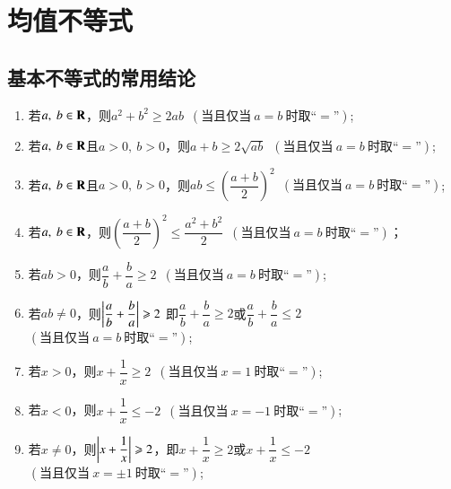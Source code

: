 \documentclass{BHCexam}
\begin{document}
\renewcommand{\theexample}{\arabic{example}}
\newenvironment{example}[1][]{\par \hspace{-3.5em}\refstepcounter{example}\textbf{例 \theexample:\ #1} \hspace{0.5em}}{\hspace{\stretch{4}} \par  }
\newcommand{\da}[1]{\noindent {\kaishu \textbf{解:}#1}}

\fubiaoti{}
 \maketitle
\section{均值不等式}
\subsection{基本不等式的常用结论}
\begin{enumerate}
\item 若$ a,~b\in\mathbf{R} $，则$ a^2+b^2\ge 2ab $\ $\left(\text{当且仅当}~a=b~\text{时取}“=”\right)$;
\item 若$ a,~b\in\mathbf{R} $且$ a>0,~b>0 $，则$ a+b\ge 2\sqrt{ab} $\ $\left(\text{当且仅当}~a=b~\text{时取}“=”\right)$;
\item 若$ a,~b\in\mathbf{R} $且$ a>0,~b>0 $，则$ab\le\left(\dfrac{a+b}{2}\right)^2$\ $\left(\text{当且仅当}~a=b~\text{时取}“=”\right)$;
\item 若$ a,~b\in\mathbf{R} $，则$ \left(\dfrac{a+b}{2}\right)^2\le \dfrac{a^2+b^2}{2} $\ $\left(\text{当且仅当}~a=b~\text{时取}“=”\right)$；
\item 若$ ab>0 $，则$ \dfrac{a}{b}+\dfrac{b}{a}\ge 2 $\ $\left(\text{当且仅当}~a=b~\text{时取}“=”\right)$;
\item 若$ ab\ne 0 $，则$ \left| \dfrac{a}{b}+\dfrac{b}{a} \right|\geqslant 2 $ 即$ \dfrac{a}{b}+\dfrac{b}{a}\ge 2 $或$ \dfrac{a}{b}+\dfrac{b}{a}\le 2 $\ $\left(\text{当且仅当}~a=b~\text{时取}“=”\right)$;
\item 若$ x>0 $，则$ x+\dfrac{1}{x}\ge2 $\ $\left(\text{当且仅当}~x=1~\text{时取}“=”\right)$;
\item 若$ x<0 $，则$ x+\dfrac{1}{x}\le -2 $\ $\left(\text{当且仅当}~x=-1~\text{时取}“=”\right)$;
\item 若$ x\ne 0 $，则$ \left| x+\dfrac{1}{x} \right|\geqslant 2 $，即$ x+\dfrac{1}{x}\ge2 $或$ x+\dfrac{1}{x}\le -2 $\ $\left(\text{当且仅当}~x=\pm 1~\text{时取}“=”\right)$;
\end{enumerate}
\end{document}
